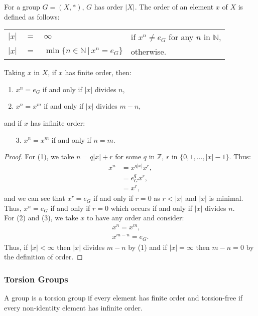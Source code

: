 For a group $G = (X, \ast)$, $G$ has order $|X|$. The order of an element $x$ of
$X$ is defined as follows: \begin{center}
    \begin{tabular}{ r c l l }
        $|x|$ & $=$ & $\infty$ & if $x^n \neq e_G$ for any $n$ in $\mathbb{N}$, \\
        $|x|$ & $=$ & $\min\{n \in \mathbb{N} \, | \, x^n = e_G\}$ & otherwise. 
    \end{tabular}
\end{center} Taking $x$ in $X$, if $x$ has finite order, then: \begin{enumerate}
    \item $x^n = e_G$ if and only if $|x|$ divides $n$,
    \item $x^n = x^m$ if and only if $|x|$ divides $m - n$,
\end{enumerate} and if $x$ has infinite order: \begin{enumerate}
    \item[3.] $x^n = x^m$ if and only if $n = m$.
\end{enumerate}

\begin{proof}
    For (1), we take $n = q|x| + r$ for some $q$ in $\mathbb{Z}$, 
    $r$ in $\{0, 1, \ldots, |x| - 1\}$. Thus: \begin{align*}
        x^n &= x^{q|x|}x^r, \\
        &= e_G^qx^r, \\
        &= x^r,
    \end{align*} and we can see that $x^r = e_G$ if and only if $r = 0$ as $r < |x|$
    and $|x|$ is minimal. Thus, $x^n = e_G$ if and only if $r = 0$ which occurs
    if and only if $|x|$ divides $n$.
    \\[\baselineskip]
    For (2) and (3), we take $x$ to have any order and consider: \begin{align*}
        x^n = x^m, \\
        x^{m - n} = e_G.
    \end{align*} Thus, if $|x| < \infty$ then $|x|$ divides $m - n$ by (1) and
    if $|x| = \infty$ then $m - n = 0$ by the definition of order.
\end{proof}

\subsubsection{Torsion Groups}

A group is a torsion group if every element has finite order and torsion-free
if every non-identity element has infinite order.

